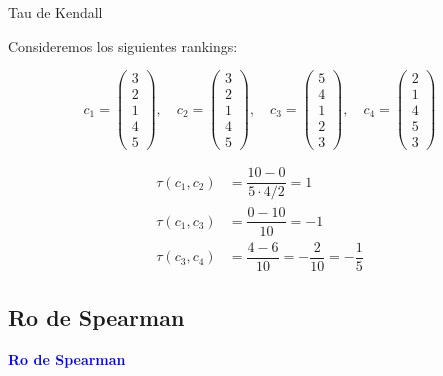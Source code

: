 \documentclass[10pt]{beamer}
\begin{document}
	\begin{frame}{Tau de Kendall}
		\begin{ejemplo}
			Consideremos los siguientes rankings:
			
			\begin{equation*}
			c_1 = \left( \begin{array}{c}
			3\\
			2\\
			1\\
			4\\
			5
			\end{array} \right), \quad
			c_2 = \left( \begin{array}{c}
			3\\
			2\\
			1\\
			4\\
			5
			\end{array} \right), \quad
			c_3 = \left( \begin{array}{c}
			5\\
			4\\
			1\\
			2\\
			3
			\end{array} \right), \quad
			c_4 = \left( \begin{array}{c}
			2\\
			1\\
			4\\
			5\\
			3
			\end{array} \right)
			\end{equation*}
			
			\begin{align*}
			\tau(c_1, c_2) & = \dfrac{10 - 0}{5 \cdot 4/2} = 1\\
			\tau(c_1, c_3) & = \dfrac{0 - 10}{10} = -1\\
			\tau(c_3, c_4) & = \dfrac{4 -  6}{10} = -\dfrac{2}{10} = - \dfrac{1}{5}
			\end{align*}
			
		\end{ejemplo}		
	\end{frame}
	
	\subsection{Ro de Spearman}
	
	\begin{frame}
		\begin{center}
			\Huge\textbf{\textsf{\textcolor{blue}{Ro de Spearman}}}
		\end{center}
	\end{frame}
	
\end{document}
